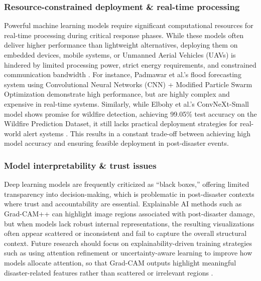 \documentclass[conference,a4paper]{IEEEtran}
\begin{document}
\subsubsection{Resource-constrained deployment \& real-time processing}
Powerful machine learning models require significant computational resources for real-time processing during critical response phases. While these models often deliver higher performance than lightweight alternatives, deploying them on embedded devices, mobile systems, or Unmanned Aerial Vehicles (UAVs) is hindered by limited processing power, strict energy requirements, and constrained communication bandwidth \cite{elbohy2025fusion}. For instance, Padmawar et al.'s flood forecasting system using Convolutional Neural Networks (CNN) + Modified Particle Swarm Optimization demonstrate high performance, but are highly complex and expensive in real-time systems. Similarly, while Elbohy et al.'s ConvNeXt-Small model shows promise for wildfire detection, achieving 99.05\% test accuracy on the Wildfire Prediction Dataset, it still lacks practical deployment strategies for real-world alert systems \cite{elbohy2025fusion}. This results in a constant trade-off between achieving high model accuracy and ensuring feasible deployment in post-disaster events.

\subsubsection{Model interpretability \& trust issues}
Deep learning models are frequently criticized as ``black boxes,'' offering limited transparency into decision-making, which is problematic in post-disaster contexts where trust and accountability are essential. Explainable AI methods such as Grad-CAM++ can highlight image regions associated with post-disaster damage, but when models lack robust internal representations, the resulting visualizations often appear scattered or inconsistent and fail to capture the overall structural context. Future research should focus on explainability-driven training strategies such as using attention refinement or uncertainty-aware learning to improve how models allocate attention, so that Grad-CAM outputs highlight meaningful disaster-related features rather than scattered or irrelevant regions \cite{lagapEnhancingPostDisasterDamage2025}.
\end{document}
